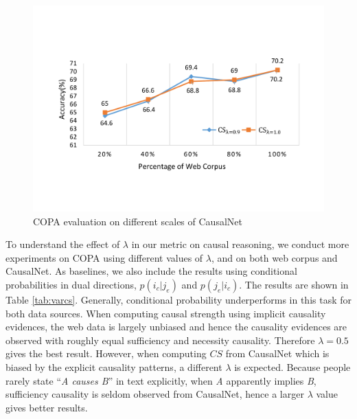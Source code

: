 \documentclass[letterpaper]{article}
\newcommand{\tabref}[1]{Table \ref{#1}}
\begin{document}
\begin{figure}[htb]
\centering
\includegraphics[width=0.8\columnwidth]{causalnet_scales.pdf}
\caption{COPA evaluation on different scales of CausalNet}
\label{fig:scale}
\end{figure}

To understand the effect of $\lambda$ in our metric on
causal reasoning, we conduct more experiments on COPA using different values
of $\lambda$, and on both web corpus and CausalNet. As baselines,
we also include the results using conditional probabilities in
dual directions, $p(i_c | j_e)$ and $p(j_e | i_c)$. The results
are shown in \tabref{tab:varcs}.
Generally, conditional probability underperforms in this task for
both data sources. When computing causal strength using implicit
causality evidences,
the web data is largely unbiased and hence
the causality evidences are observed with roughly
equal sufficiency and necessity causality. Therefore $\lambda=0.5$ gives the best result.
However, when computing $CS$ from CausalNet which is biased
by the explicit causality patterns, a different $\lambda$ is expected.
Because people rarely state ``\textit{A causes B}'' in text explicitly,
when \textit{A} apparently implies \textit{B},
sufficiency causality is seldom observed from CausalNet, 
hence a larger $\lambda$ value gives better results.
\end{document}
